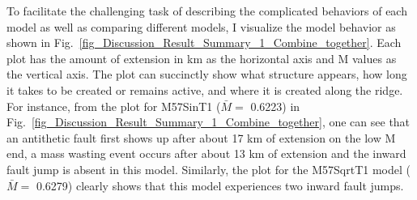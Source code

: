 
To facilitate the challenging task of describing the complicated behaviors of each model as well as comparing different models, I visualize the model behavior as shown in Fig.~\hyperref[fig_Discussion_Result_Summary_1_Combine_together]{\ref{fig_Discussion_Result_Summary_1_Combine_together}}. Each plot has the amount of extension in km as the horizontal axis and M values as the vertical axis. The plot can succinctly show what structure appears, how long it takes to be created or remains active, and where it is created along the ridge. 
For instance, from the plot for M57SinT1 ($\bar{M} =$ 0.6223) in Fig.~\hyperref[fig_Discussion_Result_Summary_1_Combine_together]{\ref{fig_Discussion_Result_Summary_1_Combine_together}}, one can see that an antithetic fault first shows up after about 17 km of extension on the low M end, a mass wasting event occurs after about 13 km of extension and the inward fault jump is absent in this model. Similarly, the plot for the M57SqrtT1 model ($\bar{M} =$ 0.6279) clearly shows that this model experiences two inward fault jumps. %


